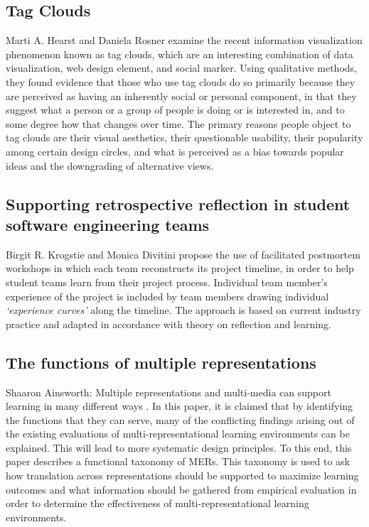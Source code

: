 \subsection{Tag Clouds}
Marti A. Hearst and Daniela Rosner \citep{Hearst2008} examine the recent information visualization phenomenon known as tag clouds, which are an interesting combination of data visualization, web design element, and social marker. Using qualitative methods, they found evidence that those who use tag clouds do so primarily because they are perceived as having an inherently social or personal component, in that they suggest what a person or a group of people is doing or is interested in, and to some degree how that changes over time. The primary reasons people object to tag clouds are their visual aesthetics, their questionable usability, their popularity among certain design circles, and what is perceived as a bias towards popular ideas and the downgrading of alternative views.

\subsection{Supporting retrospective reflection in student software engineering teams}
Birgit R. Krogstie and Monica Divitini \citep{Krogstie2009} propose the use of facilitated postmortem workshops in which each team reconstructs its project timeline, in order to help student teams learn from their project process. Individual team member's experience of the project is included by team members drawing individual \emph{‘experience curves’} along the timeline. The approach is based on current industry practice and adapted in accordance with theory on reflection and learning.

\subsection{The functions of multiple representations}
Shaaron Ainsworth: Multiple representations and multi-media can support learning in many different ways \citep{Ainsworth1999}. In this paper, it is claimed that by identifying the functions that they can serve, many of the conflicting findings arising out of the existing evaluations of multi-representational learning environments can be explained. This will lead to more systematic design principles. To this end, this paper describes a functional taxonomy of MERs. This taxonomy is used to ask how translation across representations should be supported to maximize learning outcomes and what information should be gathered from empirical evaluation in order to determine the effectiveness of multi-representational learning environments.

